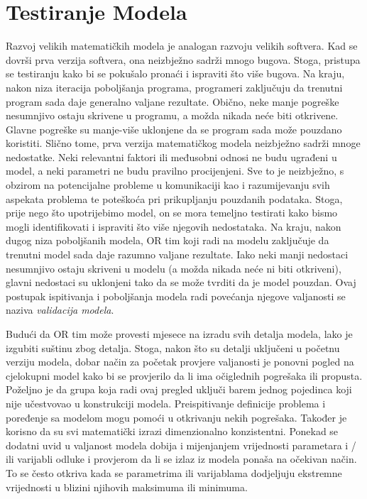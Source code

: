 \documentclass[a4paper, utf8, 11pt, colorlinks]{book}
\begin{document}
\section{Testiranje Modela}
Razvoj velikih matematičkih modela je analogan razvoju velikih softvera. Kad se dovrši prva verzija softvera, ona neizbježno sadrži mnogo bugova. Stoga, pristupa se testiranju kako bi se pokušalo pronaći i
ispraviti što više bugova. Na kraju, nakon niza iteracija poboljšanja programa, programeri zaključuju da trenutni program sada
daje generalno valjane rezultate. Obično, neke manje pogreške nesumnjivo ostaju skrivene u programu, a možda nikada neće biti otkrivene. Glavne pogreške su manje-više uklonjene da se program sada može pouzdano koristiti.  Slično tome, prva verzija matematičkog modela neizbježno sadrži mnoge
nedostatke. Neki relevantni faktori ili međusobni odnosi ne budu   ugrađeni
u model, a neki parametri ne budu pravilno procijenjeni. Sve to
je neizbježno, s obzirom na potencijalne probleme u komunikaciji kao i razumijevanju svih aspekata problema te poteškoća pri prikupljanju pouzdanih podataka. Stoga, prije nego što upotrijebimo model, on se mora  temeljno testirati kako bismo mogli  identifikovati 
i ispraviti što više njegovih nedostataka. Na kraju, nakon dugog niza poboljšanih
modela, OR tim koji radi na modelu zaključuje da trenutni model sada daje razumno valjane rezultate.  Iako neki manji nedostaci nesumnjivo ostaju skriveni u modelu (a možda nikada neće ni biti otkriveni), glavni nedostaci su uklonjeni tako da se može tvrditi da je model pouzdan. Ovaj postupak ispitivanja i poboljšanja modela radi povećanja njegove valjanosti se naziva \emph{validacija modela}. 

Budući da OR tim može provesti mjesece na izradu svih detalja modela, lako je izgubiti suštinu zbog detalja. Stoga, nakon što su detalji uključeni u 
početnu verziju modela, dobar način za početak provjere valjanosti je ponovni pogled na cjelokupni model kako bi se provjerilo da li ima  očiglednih pogrešaka ili propusta. Poželjno je da grupa koja radi ovaj pregled uključi barem jednog pojedinca koji nije učestvovao u konstrukciji modela. Preispitivanje definicije
problema i poređenje sa modelom mogu pomoći u otkrivanju nekih pogrešaka. Također je korisno da su svi matematički izrazi dimenzionalno konzistentni.  Ponekad se  dodatni uvid u valjanost modela dobija i 
mijenjanjem vrijednosti parametara i / ili varijabli odluke i provjerom da li se  izlaz iz modela ponaša na očekivan način. To se često otkriva kada se parametrima ili varijablama dodjeljuju ekstremne vrijednosti u blizini njihovih maksimuma ili minimuma. 
 
\end{document}
